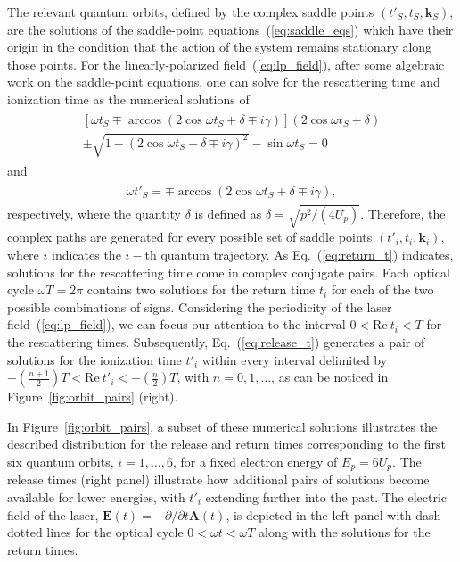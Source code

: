 The relevant quantum orbits, defined by the complex saddle points
$(t'_{S}, t_{S}, \mathbf{k}_{S})$, are the solutions of the
saddle-point equations~(\ref{eq:saddle_eqs}) which have their origin
in the condition that the action of the system remains stationary
along those points. For the linearly-polarized
field~(\ref{eq:lp_field}), after some algebraic work on the
saddle-point equations, one can solve for the rescattering time and
ionization time as the numerical solutions of~\cite{KopoldOptComm2000}
%
\begin{eqnarray}
  \label{eq:return_t}
  \begin{split}
    [\omega t_{S} \mp \arccos(2\cos\omega t_{S} + \delta \mp i\gamma)]
    (2\cos\omega t_{S} + \delta) \\
    \pm \sqrt{1 - (2\cos\omega t_{S} + \delta \mp i\gamma)^{2}} 
    - \sin\omega t_{S} = 0
  \end{split}
\end{eqnarray}
%
and
%
\begin{eqnarray}
  \label{eq:release_t}
  \begin{split}
    \omega t'_{S} = \mp \arccos(2\cos\omega t_{S} + \delta \mp i\gamma),
  \end{split}
\end{eqnarray}  
%
respectively, where the quantity $\delta$ is defined as $\delta =
\sqrt{p^{2} / (4U_{p})}$. Therefore, the complex paths are generated
for every possible set of saddle points $(t'_{i}, t_{i},
\mathbf{k}_{i})$, where $i$ indicates the $i-$th quantum
trajectory. As Eq.~(\ref{eq:return_t}) indicates, solutions for the
rescattering time come in complex conjugate pairs. Each optical cycle
$\omega T = 2\pi$ contains two solutions for the return time $t_{i}$
for each of the two possible combinations of signs.
Considering the periodicity of the laser field~(\ref{eq:lp_field}), we
can focus our attention to the interval $0 < \mathrm{Re}\ t_{i} < T$
for the rescattering times. Subsequently, Eq.~(\ref{eq:release_t})
generates a pair of solutions for the ionization time $t'_{i}$ within
every interval delimited by $-(\frac{n+1}{2}) T < \mathrm{Re}\ t'_{i}
< -(\frac{n}{2})T$, with $n = 0,1,\dots$, as can be noticed in
Figure~\ref{fig:orbit_pairs} (right).

In Figure~\ref{fig:orbit_pairs}, a subset of these numerical solutions
illustrates the described distribution for the release and return
times corresponding to the first six quantum orbits, $i = 1, \dots,
6$, for a fixed electron energy of $E_{p} = 6 U_{p}$.  The release
times (right panel) illustrate how additional pairs of solutions
become available for lower energies, with $t'_{i}$ extending further
into the past. The electric field of the laser, $\mathbf{E}(t) =
-\partial/\partial t \mathbf{A}(t)$, is depicted in the left panel
with dash-dotted lines for the optical cycle $0 < \omega t < \omega T$
along with the solutions for the return times.

